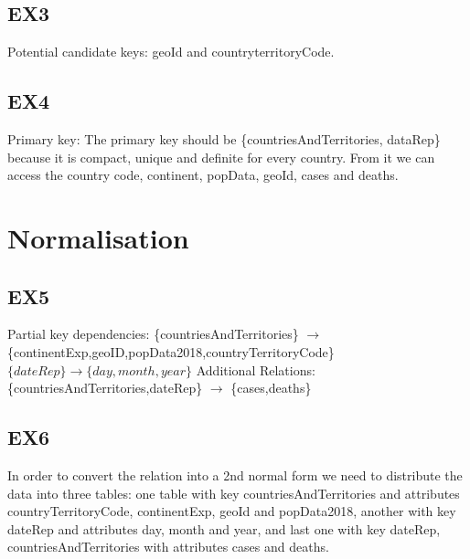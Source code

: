 \documentclass{article}
\begin{document}
\subsection{EX3}
Potential candidate keys:
\newline
geoId and countryterritoryCode.
\newline
\newline

\subsection{EX4}
Primary key:
\newline
The primary key should be \{countriesAndTerritories, dataRep\} because it is compact, unique and definite for every country. From it we can access the country code, continent, popData, geoId, cases and deaths.
\newline
\newline

\section{Normalisation}
\subsection{EX5}
Partial key dependencies:
\newline
\newline
\{countriesAndTerritories\} $\longrightarrow$ \{continentExp,geoID,popData2018,countryTerritoryCode\}
\newline
\newline
$\{dateRep\}  \longrightarrow  \{day,month,year\}$
\newline
\newline
Additional Relations:
\newline
\newline
\{countriesAndTerritories,dateRep\} $\longrightarrow$ \{cases,deaths\}
\newline
\newline
\subsection{EX6}
In order to convert the relation into  a 2nd normal form we need to distribute the data into three tables: one table with key countriesAndTerritories and attributes countryTerritoryCode, continentExp, geoId and popData2018, another with key dateRep and attributes day, month and year, and last one with key {dateRep, countriesAndTerritories} with attributes cases and deaths.
\newline
\newline
\end{document}
